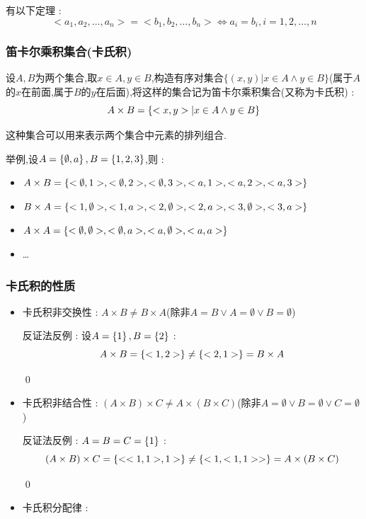 {{{{    有以下定理 : $$
      <a_1,a_2,\dots,a_n> = <b_1,b_2,\dots,b_n> \Leftrightarrow a_i = b_i,i = 1,2,\dots,n
    $$
  }%

  \subsubsection{笛卡尔乘积集合(卡氏积)}{
    设$A,B$为两个集合,取$x \in A,y \in B$,构造有序对集合$\{(x,y)| x \in A \land y \in B\}$(属于$A$的$x$在前面,属于$B$的$y$在后面),将这样的集合记为笛卡尔乘积集合(又称为卡氏积) : $$
      A \times B = \left\{ <x,y>|x \in A \land y \in B \right\}
    $$

    这种集合可以用来表示两个集合中元素的排列组合.

    举例,设$A = \left\{ \emptyset,a \right\},B = \left\{ 1,2,3 \right\}$,则 :

    \begin{itemize}
      \item $A \times B = \left\{ <\emptyset,1>,<\emptyset,2>,<\emptyset,3>,<a,1>,<a,2>,<a,3> \right\}$
      \item $B \times A = \left\{ <1,\emptyset>,<1,a>,<2,\emptyset>,<2,a>,<3,\emptyset>,<3,a> \right\}$
      \item $A \times A = \left\{ <\emptyset,\emptyset>,<\emptyset,a>,<a,\emptyset>,<a,a> \right\}$
      \item \dots
    \end{itemize}
  }%

  \subsubsection{卡氏积的性质}{
    \begin{itemize}
      \item {
            卡氏积非交换性 : $A \times B \neq B \times A$(除非$A = B \lor A = \emptyset \lor B = \emptyset$)

            反证法反例 : 设$A = \left\{ 1 \right\},B = \left\{ 2 \right\}$ : $$
              A \times B = \left\{ <1,2> \right\} \neq \left\{ <2,1> \right\} = B \times A
            $$

            \qed
            }
      \item {
            卡氏积非结合性 : $(A \times B) \times C \neq A \times (B \times C)$(除非$A = \emptyset \lor B = \emptyset \lor C = \emptyset$)

            反证法反例 : $A = B = C = \left\{ 1 \right\}$ : $$
              (A \times B) \times C = \left\{ <<1,1>,1> \right\} \neq \left\{ <1,<1,1>> \right\} = A \times (B \times C)
            $$

            \qed
            }
      \item {
            卡氏积分配律 :

}
\end{itemize}}}}}
